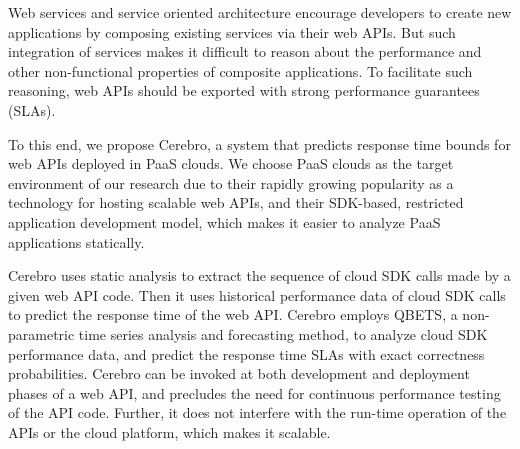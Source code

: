 Web services and service oriented architecture encourage developers to create new applications by
composing existing services via their web APIs. But such integration of services makes it difficult to
reason about the performance and other non-functional properties of 
composite applications. To
facilitate such reasoning, web APIs should be exported with strong performance 
guarantees (SLAs).%

To this end,
we propose Cerebro, a system that predicts response time 
bounds for web APIs deployed in PaaS clouds. We
choose PaaS clouds as the target environment of our 
research due to their rapidly growing popularity as a technology
for hosting scalable web APIs, and their SDK-based, restricted 
application development model, 
which makes it easier to analyze PaaS applications statically.

Cerebro uses static analysis to extract the sequence of cloud SDK 
calls made by a given web API code. Then it
uses historical performance data of cloud SDK calls to predict the response time of the web
API. 
Cerebro employs QBETS, a non-parametric time series analysis and 
forecasting method, to analyze
cloud SDK performance data, and predict the response time SLAs with exact correctness
probabilities. Cerebro can be invoked at both development and 
deployment phases of a web API, and 
precludes the need for continuous performance testing of the API code. 
Further, it does not interfere with the run-time operation
of the APIs or the cloud platform, which makes it scalable.

